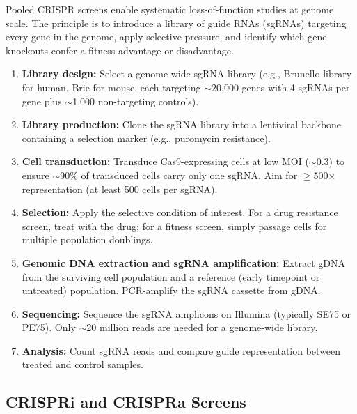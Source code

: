Pooled CRISPR screens enable systematic loss-of-function studies at genome scale. The principle is to introduce a library of guide RNAs (sgRNAs) targeting every gene in the genome, apply selective pressure, and identify which gene knockouts confer a fitness advantage or disadvantage.

\begin{protocolbox}[title={Pooled CRISPR Knockout Screen Workflow}]
\begin{enumerate}[itemsep=2pt]
  \item \textbf{Library design:} Select a genome-wide sgRNA library (e.g., Brunello library for human, Brie for mouse, each targeting $\sim$20,000 genes with 4 sgRNAs per gene plus $\sim$1,000 non-targeting controls).
  \item \textbf{Library production:} Clone the sgRNA library into a lentiviral backbone containing a selection marker (e.g., puromycin resistance).
  \item \textbf{Cell transduction:} Transduce Cas9-expressing cells at low MOI ($\sim$0.3) to ensure $\sim$90\% of transduced cells carry only one sgRNA. Aim for $\geq$500$\times$ representation (at least 500 cells per sgRNA).
  \item \textbf{Selection:} Apply the selective condition of interest. For a drug resistance screen, treat with the drug; for a fitness screen, simply passage cells for multiple population doublings.
  \item \textbf{Genomic DNA extraction and sgRNA amplification:} Extract gDNA from the surviving cell population and a reference (early timepoint or untreated) population. PCR-amplify the sgRNA cassette from gDNA.
  \item \textbf{Sequencing:} Sequence the sgRNA amplicons on Illumina (typically SE75 or PE75). Only $\sim$20 million reads are needed for a genome-wide library.
  \item \textbf{Analysis:} Count sgRNA reads and compare guide representation between treated and control samples.
\end{enumerate}
\end{protocolbox}

\subsection{CRISPRi and CRISPRa Screens}
\label{subsec:specialized:crispri-crispra}

